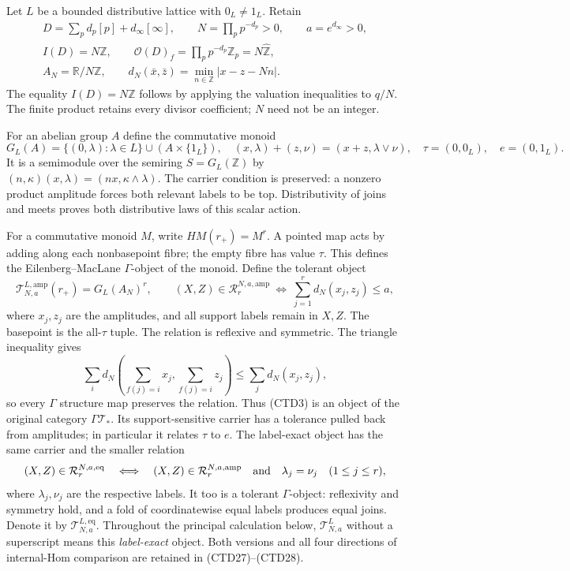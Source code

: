 Let $L$ be a bounded distributive lattice with $0_L\ne1_L$.
Retain
\begin{equation}\tag{CTD1}
\begin{gathered}
D=\sum_p d_p[p]+d_\infty[\infty],\qquad
N=\prod_p p^{-d_p}>0,\qquad a=e^{d_\infty}>0,\\
I(D)=N\mathbb Z,\qquad
\mathcal O(D)_f=\prod_p p^{-d_p}\mathbb Z_p
=N\widehat{\mathbb Z},\\
A_N=\mathbb R/N\mathbb Z,\qquad
d_N(\bar x,\bar z)=\min_{n\in\mathbb Z}|x-z-Nn|.
\end{gathered}
\end{equation}
The equality $I(D)=N\mathbb Z$ follows by applying the valuation
inequalities to $q/N$. The finite product retains every divisor
coefficient; $N$ need not be an integer.

For an abelian group $A$ define the commutative monoid
\begin{equation}\tag{CTD2}
G_L(A)=\{(0,\lambda):\lambda\in L\}\cup(A\times\{1_L\}),\quad
(x,\lambda)+(z,\nu)=(x+z,\lambda\vee\nu),\quad
\tau=(0,0_L),\quad e=(0,1_L).
\end{equation}
It is a semimodule over the semiring $S=G_L(\mathbb Z)$ by
$(n,\kappa)(x,\lambda)=(nx,\kappa\wedge\lambda)$.
The carrier condition is preserved: a nonzero product amplitude
forces both relevant labels to be top. Distributivity of joins
and meets proves both distributive laws of this scalar action.

For a commutative monoid $M$, write $HM(r_+)=M^r$.
A pointed map acts by adding along each nonbasepoint fibre; the
empty fibre has value $\tau$. This defines the Eilenberg--MacLane
$\Gamma$-object of the monoid. Define the tolerant object
\begin{equation}\tag{CTD3}
\mathcal T^{L,\mathrm{amp}}_{N,a}(r_+)=G_L(A_N)^r,\qquad
(X,Z)\in\mathcal R^{N,a,\mathrm{amp}}_r
\ \Longleftrightarrow\
\sum_{j=1}^r d_N(x_j,z_j)\le a,
\end{equation}
where $x_j,z_j$ are the amplitudes, and all support labels remain
in $X,Z$. The basepoint is the all-$\tau$ tuple.
The relation is reflexive and symmetric. The triangle inequality
gives
\[
\sum_i d_N\!\left(\sum_{f(j)=i}x_j,\sum_{f(j)=i}z_j\right)
\le\sum_jd_N(x_j,z_j),
\]
so every $\Gamma$ structure map preserves the relation. Thus
(CTD3) is an object of the original category $\Gamma\mathcal T_*$.
Its support-sensitive carrier has a tolerance pulled back from
amplitudes; in particular it relates $\tau$ to $e$.
The label-exact object has the same carrier and the smaller relation
\[
(X,Z)\in\mathcal R^{N,a,\mathrm{eq}}_r
\quad\Longleftrightarrow\quad
(X,Z)\in\mathcal R^{N,a,\mathrm{amp}}_r
\quad\hbox{and}\quad \lambda_j=\nu_j\quad(1\le j\le r),
\]
where $\lambda_j,\nu_j$ are the respective labels.
It too is a tolerant $\Gamma$-object: reflexivity and symmetry
hold, and a fold of coordinatewise equal labels produces equal
joins. Denote it by $\mathcal T^{L,\mathrm{eq}}_{N,a}$.
Throughout the principal calculation below,
$\mathcal T^L_{N,a}$ without a superscript means this
\emph{label-exact} object. Both versions and all four directions
of internal-Hom comparison are retained in (CTD27)--(CTD28).

